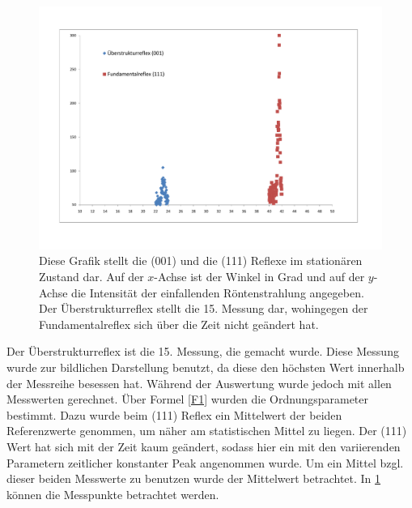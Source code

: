 \documentclass[
	a4paper,
	12pt,
	pagesize,
	ngerman
]{scrartcl}
\begin{document}
\begin{figure}[h!]
    \centering
    \includegraphics[scale = 0.5]{001 und 111.pdf}
    \caption{Diese Grafik stellt die (001) und die (111) Reflexe im stationären Zustand dar. Auf der $x$-Achse ist der Winkel in Grad und auf der $y$-Achse die Intensität der einfallenden Röntenstrahlung angegeben. Der Überstrukturreflex stellt die 15. Messung dar, wohingegen der Fundamentalreflex sich über die Zeit nicht geändert hat.}
    \label{A4}
\end{figure}
Der Überstrukturreflex ist die 15. Messung, die gemacht wurde. Diese Messung wurde zur bildlichen Darstellung benutzt, da diese den höchsten Wert innerhalb der Messreihe besessen hat. Während der Auswertung wurde jedoch mit allen Messwerten gerechnet.
Über Formel \cref{F1} wurden die Ordnungsparameter bestimmt. Dazu wurde beim (111) Reflex ein Mittelwert der beiden Referenzwerte genommen, um näher am statistischen Mittel zu liegen. Der (111) Wert hat sich mit der Zeit kaum geändert, sodass hier ein mit den variierenden Parametern zeitlicher konstanter Peak angenommen wurde. Um ein Mittel bzgl. dieser beiden Messwerte zu benutzen wurde der Mittelwert betrachtet. In \cref{A4} können die Messpunkte betrachtet werden. 
\end{document}
